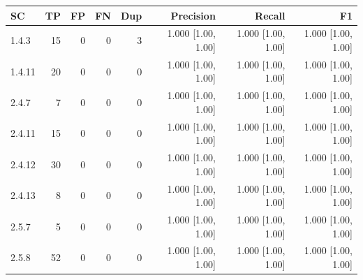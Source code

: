 \begin{tabular}{lrrrrrrr}
\hline
SC & TP & FP & FN & Dup & Precision & Recall & F1 \\
\hline
1.4.3 & 15 & 0 & 0 & 3 & 1.000 [1.00, 1.00] & 1.000 [1.00, 1.00] & 1.000 [1.00, 1.00] \\
1.4.11 & 20 & 0 & 0 & 0 & 1.000 [1.00, 1.00] & 1.000 [1.00, 1.00] & 1.000 [1.00, 1.00] \\
2.4.7 & 7 & 0 & 0 & 0 & 1.000 [1.00, 1.00] & 1.000 [1.00, 1.00] & 1.000 [1.00, 1.00] \\
2.4.11 & 15 & 0 & 0 & 0 & 1.000 [1.00, 1.00] & 1.000 [1.00, 1.00] & 1.000 [1.00, 1.00] \\
2.4.12 & 30 & 0 & 0 & 0 & 1.000 [1.00, 1.00] & 1.000 [1.00, 1.00] & 1.000 [1.00, 1.00] \\
2.4.13 & 8 & 0 & 0 & 0 & 1.000 [1.00, 1.00] & 1.000 [1.00, 1.00] & 1.000 [1.00, 1.00] \\
2.5.7 & 5 & 0 & 0 & 0 & 1.000 [1.00, 1.00] & 1.000 [1.00, 1.00] & 1.000 [1.00, 1.00] \\
2.5.8 & 52 & 0 & 0 & 0 & 1.000 [1.00, 1.00] & 1.000 [1.00, 1.00] & 1.000 [1.00, 1.00] \\
\hline
\end{tabular}

